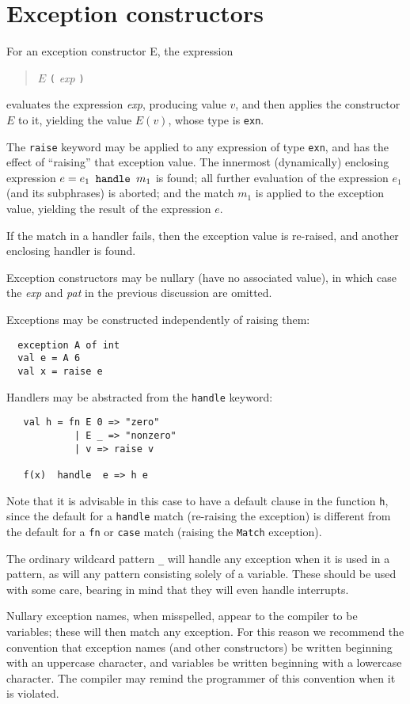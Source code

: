 \section{Exception constructors}
For an exception constructor E, the expression
\begin{quote}
$E$ \verb"(" {\it exp} \verb")"
\end{quote}
evaluates the expression {\it exp}, producing value $v$,
and then applies the constructor $E$ to it, yielding the value
$E(v)$, whose type is \verb"exn".

The \verb"raise" keyword may be applied to any expression of type
\verb"exn", and has the effect of ``raising'' that exception value.
The innermost (dynamically) enclosing expression $e = e_1
\verb" handle " m_1$ is found; all further evaluation of the
expression $e_1$ (and its subphrases) is aborted; and the match $m_1$
is applied to the exception value, yielding  the result of the
expression $e$.  

If the match in a handler fails, then the exception value is
\label{reraise}
re-raised, and another enclosing handler is found.

Exception constructors may be nullary (have no associated value), in
which case the {\it exp} and {\it pat} in the previous discussion are
omitted.

Exceptions may be constructed independently of raising them:
\begin{verbatim}
  exception A of int
  val e = A 6
  val x = raise e
\end{verbatim}
Handlers may be abstracted from the \verb"handle" keyword:
\begin{verbatim}
   val h = fn E 0 => "zero"
            | E _ => "nonzero"
            | v => raise v

   f(x)  handle  e => h e
\end{verbatim}
Note that it is advisable in this case to have a default clause in
the function \verb"h", since the default for a \verb"handle" match
(re-raising the exception) is different from the default for a \verb"fn" or
\verb"case" match (raising the \verb"Match" exception).

The ordinary wildcard pattern 
\verb"_" will handle any exception when it is used in a pattern, as
will any pattern consisting solely of a variable.  These should be
used with some care, bearing in mind that they will even handle
interrupts.

Nullary exception names, when misspelled, appear to the compiler to be
variables; these will then match any exception.  For this reason we
recommend the convention that exception names (and other
constructors) be written beginning with an uppercase character, and
variables be written beginning with a lowercase character.  The
compiler may remind the programmer of this convention when it is
violated.

